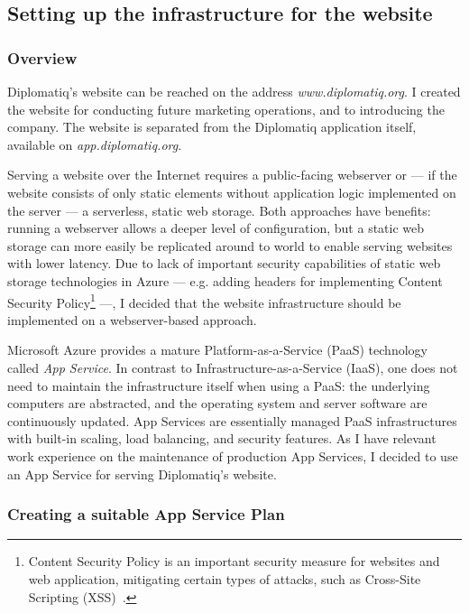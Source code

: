 \subsection{Setting up the infrastructure for the website}

\subsubsection{Overview}

Diplomatiq's website can be reached on the address \emph{www.diplomatiq.org}. I created the website for conducting future marketing operations, and to introducing the company. The website is separated from the Diplomatiq application itself, available on \emph{app.diplomatiq.org}.

Serving a website over the Internet requires a public-facing webserver or — if the website consists of only static elements without application logic implemented on the server — a serverless, static web storage. Both approaches have benefits: running a webserver allows a deeper level of configuration, but a static web storage can more easily be replicated around to world to enable serving websites with lower latency. Due to lack of important security capabilities of static web storage technologies in Azure — e.g. adding headers for implementing Content Security Policy\footnote{Content Security Policy is an important security measure for websites and web application, mitigating certain types of attacks, such as Cross-Site Scripting (XSS)~\cite{csp-mdn}.} —, I decided that the website infrastructure should be implemented on a webserver-based approach.

Microsoft Azure provides a mature Platform-as-a-Service (PaaS) technology called \emph{App Service}. In contrast to Infrastructure-as-a-Service (IaaS), one does not need to maintain the infrastructure itself when using a PaaS: the underlying computers are abstracted, and the operating system and server software are continuously updated. App Services are essentially managed PaaS infrastructures with built-in scaling, load balancing, and security features. As I have relevant work experience on the maintenance of production App Services, I decided to use an App Service for serving Diplomatiq's website.

\subsubsection{Creating a suitable App Service Plan}

